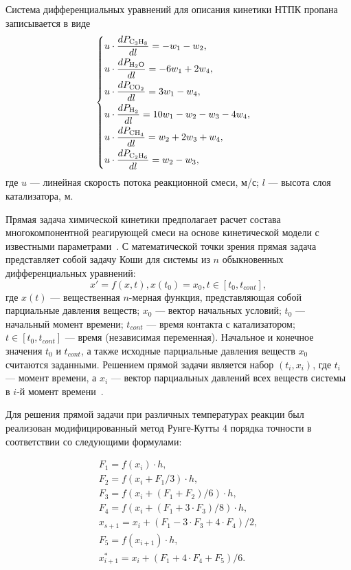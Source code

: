 \documentclass{cmi1}
\begin{document}
Система дифференциальных уравнений для описания кинетики НТПК пропана записывается в виде
\begin{equation}
\begin{cases}
\displaystyle u\cdot \frac{dP_{\ce{C3H8}}}{dl} = -w_{1}-w_{2},\\[2mm]
\displaystyle u\cdot \frac{dP_{\ce{H2O}}}{dl} = -6w_{1}+2w_{4},\\[2mm]
\displaystyle u\cdot \frac{dP_{\ce{CO2}}}{dl} = 3w_{1}-w_{4},\\[2mm]
\displaystyle u\cdot \frac{dP_{\ce{H2}}}{dl} = 10w_{1}-w_{2}-w_{3}-4w_{4},\\[2mm]
\displaystyle u\cdot \frac{dP_{\ce{CH4}}}{dl} = w_{2}+2w_{3}+w_{4},\\[2mm]
\displaystyle u\cdot \frac{dP_{\ce{C2H6}}}{dl} = w_{2}-w_{3},
\end{cases}
\end{equation}
где $u$ --- линейная скорость потока реакционной смеси, м/с; $l$ --- высота слоя катализатора, м.

Прямая задача химической кинетики предполагает расчет состава многокомпонентной реагирующей смеси на основе кинетической модели с известными параметрами~.
С математической точки зрения прямая задача представляет собой задачу Коши для системы из $n$ обыкновенных дифференциальных уравнений:
\begin{equation}
x'=f(x, t), x(t_{0}) = x_{0}, t\in[t_{0},t_{cont}],
\end{equation}
где $x(t)$ --- вещественная $n$-мерная функция, представляющая собой парциальные давления веществ; $x_{0}$ --- вектор начальных условий; $t_{0}$ --- начальный момент времени; $t_{cont}$ --- время контакта с катализатором; $t \in [t_{0},t_{cont}]$ --- время (независимая переменная).
Начальное и конечное значения $t_{0}$ и $t_{cont}$, а также исходные парциальные давления веществ $x_{0}$ считаются заданными.
Решением прямой задачи является набор $(t_i, x_i)$, где $t_i$ --- момент времени, а $x_i$ --- вектор парциальных давлений всех веществ системы в $i$-й момент времени~.

Для решения прямой задачи при различных температурах реакции был реализован модифицированный метод Рунге-Кутты 4 порядка точности в соответствии со следующими формулами:

\begin{equation}
\begin{array}{l}
F_{1}=f(x_{i})\cdot h,\\
F_{2}=f(x_{i}+F_{1}/3)\cdot h,\\
F_{3}=f(x_{i}+(F_{1}+F_{2})/6)\cdot h,\\
F_{4}=f(x_{i}+(F_{1}+3 \cdot F_{3})/8)\cdot h,\\
x_{s+1}=x_{i} + (F_{1}-3 \cdot F_{3} + 4 \cdot F_{4})/ 2,\\
F_{5}=f(x_{i+1})\cdot h,\\
x^*_{i+1}=x_{i} + (F_{1}+4 \cdot F_{4} + F_{5})/ 6.\\
\end{array}
\end{equation}
\end{document}
